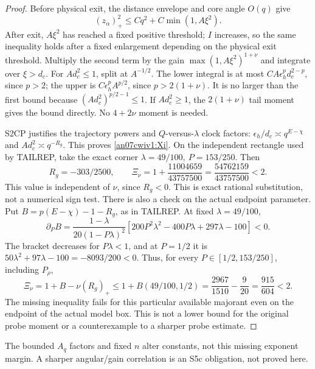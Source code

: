 \documentclass[11pt]{article}
\numberwithin{equation}{section}
\theoremstyle{remark}\newtheorem{remark}[theorem]{Remark}
\begin{document}
\begin{proof}
Before physical exit, the distance envelope and core angle
\(O(q)\) give
\[
 (z_\alpha)_+^2\le Cq^2+C\min(1,A\xi^2).
 \]
After exit, \(A\xi^2\) has reached a fixed positive threshold;
\(I\) increases, so the same inequality holds after a fixed
enlargement depending on the physical exit threshold.
Multiply the second term by the gain
\(\max(1,A\xi^2)^{1+\nu}\) and integrate over \(\xi>d_c\).
For \(Ad_c^2\le1\), split at \(A^{-1/2}\).
The lower integral is at most
\(C A\epsilon_h^p d_c^{2-p}\), since \(p>2\);
the upper is \(C\epsilon_h^p A^{p/2}\), since \(p>2(1+\nu)\).
It is no larger than the first bound because
\((Ad_c^2)^{p/2-1}\le1\).
If \(Ad_c^2\ge1\), the \(2(1+\nu)\) tail moment gives
the bound directly. No \(4+2\nu\) moment is needed.

S2CP justifies the trajectory powers and \(Q\)-versus-\(\lambda\)
clock factors: \(\epsilon_h/d_c\asymp q^{E-\chi}\) and
\(Ad_c^2\asymp q^{-R_g}\). This proves \eqref{an07cwiv1:Xi}.
On the independent rectangle used by TAILREP, take the exact
corner \(\lambda=49/100,\ P=153/250\). Then
\[
 R_g=-303/2500,\qquad
 \Xi_\nu=1+\frac{11004659}{43757500}
        =\frac{54762159}{43757500}<2.
 \]
This value is independent of \(\nu\), since \(R_g<0\).
This is exact rational substitution, not a numerical sign test.
There is also a check on the actual endpoint parameter.
Put \(B=p(E-\chi)-1-R_g\), as in TAILREP. At fixed
\(\lambda=49/100\),
\[
 \partial_P B=\frac{1-\lambda}{20(1-P\lambda)^2}
 [200P^2\lambda^2-400P\lambda+297\lambda-100]<0 .
 \]
The bracket decreases for \(P\lambda<1\), and at \(P=1/2\)
it is \(50\lambda^2+97\lambda-100=-8093/200<0\).
Thus, for every \(P\in[1/2,153/250]\), including \(P_\rho\),
\[
 \Xi_\nu=1+B-\nu(R_g)_+
 \le1+B(49/100,1/2)
 =\frac{2967}{1510}-\frac9{20}=\frac{915}{604}<2.
 \]
The missing inequality fails for this particular available
majorant even on the endpoint of the actual model box.
This is not a lower bound for the original probe moment or
a counterexample to a sharper probe estimate.
\end{proof}
The bounded \(A_q\) factors and fixed \(n\) alter constants,
not this missing exponent margin. A sharper angular/gain
correlation is an S5c obligation, not proved here.
\end{document}
